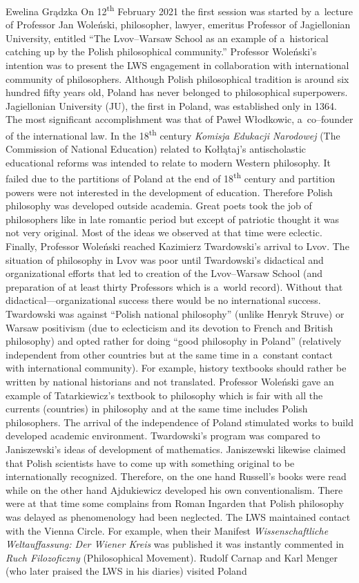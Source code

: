 \begin{editorialeng}{Ewelina Grądzka}
On 12\textsuperscript{th} February 2021 the first session was started by a~lecture of Professor Jan Woleński, philosopher, lawyer, emeritus Professor of Jagiellonian University, entitled ``The Lvov--Warsaw School as an example of a~historical catching up by the Polish philosophical community.'' Professor Woleński’s intention was to present the LWS engagement in collaboration with international community of philosophers. Although Polish philosophical tradition is around six hundred fifty years old, Poland has never belonged to philosophical superpowers. Jagiellonian University (JU), the first in Poland, was established only in 1364. The most significant accomplishment was that of Paweł Włodkowic, a~co--founder of the international law. In the 18\textsuperscript{th} century \textit{Komisja Edukacji Narodowej} (The Commission of National Education) related to Kołłątaj’s antischolastic educational reforms was intended to relate to modern Western philosophy. It failed due to the partitions of Poland at the end of 18\textsuperscript{th} century and partition powers were not interested in the development of education. Therefore Polish philosophy was developed outside academia. Great poets took the job of philosophers like in late romantic period but except of patriotic thought it was not very original. Most of the ideas we observed at that time were eclectic. Finally, Professor Woleński reached Kazimierz Twardowski’s arrival to Lvov. The situation of philosophy in Lvov was poor until Twardowski’s didactical and organizational efforts that led to creation of the Lvov--Warsaw School (and preparation of at least thirty Professors which is a~world record). Without that didactical---organizational success there would be no international success. Twardowski was against ``Polish national philosophy'' (unlike Henryk Struve) or Warsaw positivism (due to eclecticism and its devotion to French and British philosophy) and opted rather for doing ``good philosophy in Poland'' (relatively independent from other countries but at the same time in a~constant contact with international community). For example, history textbooks should rather be written by national historians and not translated. Professor Woleński gave an example of Tatarkiewicz’s textbook to philosophy which is fair with all the currents (countries) in philosophy and at the same time includes Polish philosophers. The arrival of the independence of Poland stimulated works to build developed academic environment. Twardowski’s program was compared to Janiszewski’s ideas of development of mathematics. Janiszewski likewise claimed that Polish scientists have to come up with something original to be internationally recognized. Therefore, on the one hand Russell’s books were read while on the other hand Ajdukiewicz developed his own conventionalism. There were at that time some complains from Roman Ingarden that Polish philosophy was delayed as phenomenology had been neglected. The LWS maintained contact with the Vienna Circle. For example, when their Manifest \textit{Wissenschaftliche Weltauffassung: Der Wiener Kreis} was published it was instantly commented in \textit{Ruch Filozoficzny} (Philosophical Movement). Rudolf Carnap and Karl Menger (who later praised the LWS in his diaries) visited Poland 
\end{editorialeng}

